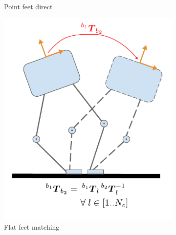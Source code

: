 \begin{figure}
\begin{subfigure}{.33\linewidth}
        \caption{Point feet direct}
    \end{subfigure}%
    
    \bigskip
    \begin{subfigure}{.33\linewidth}
        \centering
        \includegraphics[width=\textwidth]{figures/robot_kinematic_types_flat_matching.pdf}
        \caption{Flat feet matching}
    \end{subfigure}%
        \hfill
    \begin{subfigure}{.33\linewidth}
        \centering

\end{subfigure}
\end{figure}
